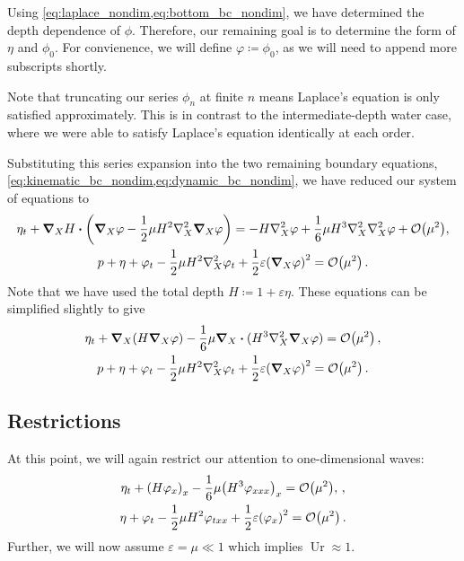 \documentclass{jfm}
\DeclareMathOperator{\Ur}{Ur}
\renewcommand*{\epsilon}{\varepsilon}
\begin{document}
Using \cref{eq:laplace_nondim,eq:bottom_bc_nondim}, we have determined
the depth dependence of $\phi$.
Therefore, our remaining goal is to determine the form of $\eta$ and
$\phi_0$.
For convienence, we will define $\varphi \coloneqq \phi_0$, as we will
need to append more subscripts shortly.

Note that truncating our series $\phi_n$ at finite $n$ means
Laplace's equation is only satisfied approximately.
This is in contrast to the intermediate-depth water case, where we were
able to satisfy Laplace's equation identically at each order.

Substituting this series expansion into the two
remaining boundary equations,
\cref{eq:kinematic_bc_nondim,eq:dynamic_bc_nondim}, we have reduced our
system of equations to
\begin{gather}
  \eta_t + \grad_X{H}\vdot\pqty{\grad_X\varphi
    -\frac{1}{2}\mu H^2\laplacian_X\grad_X\varphi} =
    -H\laplacian_X\varphi
  +\frac{1}{6}\mu H^3\laplacian_X\laplacian_X\varphi +
    \order{\mu^2}, \\
  p + \eta + \varphi_{t} - \frac{1}{2}\mu H^2\laplacian_X\varphi_{t} +
    \frac{1}{2}\epsilon \pqty{\grad_X\varphi}^2 = \order{\mu^2}
    \,.
\end{gather}
Note that we have used the total depth $H\coloneqq 1+\epsilon\eta$.
These equations can be simplified slightly to give
\begin{gather}
  \eta_t + \grad_X(H\grad_X\varphi)
    -\frac{1}{6}\mu \grad_X\vdot(H^3\laplacian_X\grad_X\varphi) =
    \order{\mu^2} \,, \\
  p + \eta + \varphi_{t} - \frac{1}{2}\mu H^2\laplacian_X\varphi_{t} +
    \frac{1}{2}\epsilon\pqty{\grad_X\varphi}^2 = \order{\mu^2}
    \,.
\end{gather}

\subsection{Restrictions}
At this point, we will again restrict our attention to one-dimensional
waves:
\begin{gather}
  \eta_t + \pqty{H\varphi_x}_x
    -\frac{1}{6}\mu \pqty{H^3\varphi_{xxx}}_x =
    \order{\mu^2}, \label{eq:kinematic_bc_varphi} \,, \\
  \eta + \varphi_t - \frac{1}{2}\mu H^2\varphi_{txx} +
    \frac{1}{2}\epsilon\pqty{\varphi_x}^2 = \order{\mu^2} \,.
  \label{eq:dynamic_bc_varphi}
\end{gather}
Further, we will now assume $\epsilon = \mu \ll 1$ which implies $\Ur
\approx 1$.
\end{document}

